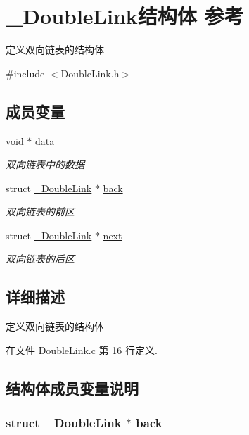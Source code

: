 \hypertarget{struct___double_link}{\section{\-\_\-\-Double\-Link结构体 参考}
\label{struct___double_link}
}


定义双向链表的结构体  




{\ttfamily \#include $<$Double\-Link.\-h$>$}

\subsection*{成员变量}
\begin{DoxyCompactItemize}
\item 
void $\ast$ \hyperlink{struct___double_link_ac5c5967f62e5c3601479be651a8ed76c}{data}
\begin{DoxyCompactList}\small\item\em 双向链表中的数据 \end{DoxyCompactList}\item 
struct \hyperlink{struct___double_link}{\-\_\-\-Double\-Link} $\ast$ \hyperlink{struct___double_link_af341c0d6517f5032958cd89884e6230e}{back}
\begin{DoxyCompactList}\small\item\em 双向链表的前区 \end{DoxyCompactList}\item 
struct \hyperlink{struct___double_link}{\-\_\-\-Double\-Link} $\ast$ \hyperlink{struct___double_link_a639ac2cfb816181dcb50312819536299}{next}
\begin{DoxyCompactList}\small\item\em 双向链表的后区 \end{DoxyCompactList}\end{DoxyCompactItemize}


\subsection{详细描述}
定义双向链表的结构体 

在文件 Double\-Link.\-c 第 16 行定义.



\subsection{结构体成员变量说明}
\hypertarget{struct___double_link_af341c0d6517f5032958cd89884e6230e}{
\subsubsection[{back}]{\setlength{\rightskip}{0pt plus 5cm}struct {\bf \-\_\-\-Double\-Link} $\ast$ back}}\label{struct___double_link_af341c0d6517f5032958cd89884e6230e}


